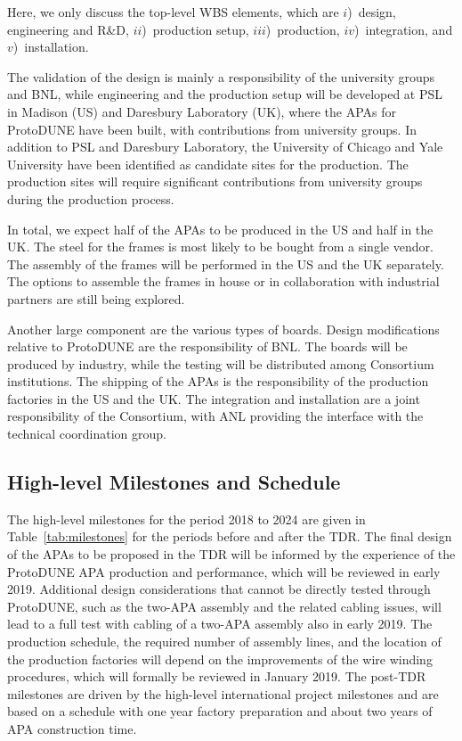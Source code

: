 Here, we only discuss the top-level WBS elements, which are $i$)~design, engineering and R\&D, $ii$)~production setup, $iii$)~production, $iv$)~integration, and $v$)~installation.

The validation of the design is mainly a responsibility of the university groups and BNL, while engineering and the production setup will be developed at PSL in Madison (US) and Daresbury Laboratory (UK), where the APAs for ProtoDUNE have been built, with contributions from university groups. In addition to PSL and Daresbury Laboratory, the University of Chicago and Yale
University have been identified as candidate sites for the 
production. The production sites will require significant contributions from university groups during the production process. 

In total, we expect half of the APAs to be produced in the US and half in the UK. The steel for the frames is most likely to be bought from a single vendor. The assembly of the frames will be performed in the US and the UK separately. The options to assemble the frames in house or in collaboration with industrial partners are still being explored. 

Another large component are the various types of boards. Design modifications relative to ProtoDUNE are the responsibility of BNL. The boards will be produced by industry, while the testing will be distributed among Consortium institutions. The shipping of the APAs is the responsibility of the production factories in the US and the UK.  The integration and installation are a joint responsibility of the Consortium, with ANL providing the interface with the technical coordination group.


\subsection{High-level Milestones and Schedule}
\label{sec:fdsp-apa-org-cs}

The high-level milestones for the period 2018 to 2024 are given in Table~\ref{tab:milestones} for the periods before and after the TDR. The final design of the APAs to be proposed in the TDR will be informed by the experience of the ProtoDUNE APA production and performance, which will be reviewed in early 2019. Additional design considerations that cannot be directly tested through ProtoDUNE, such as the two-APA assembly and the related cabling issues, will lead to a full test with cabling of a two-APA assembly also in early 2019. The production schedule, the required number of assembly lines, and the location of the production factories will depend on the improvements of the wire winding procedures, which will formally be reviewed in January 2019. The post-TDR milestones are driven by the high-level international project milestones and are based on a schedule with one year factory preparation and about two years of APA construction time.

